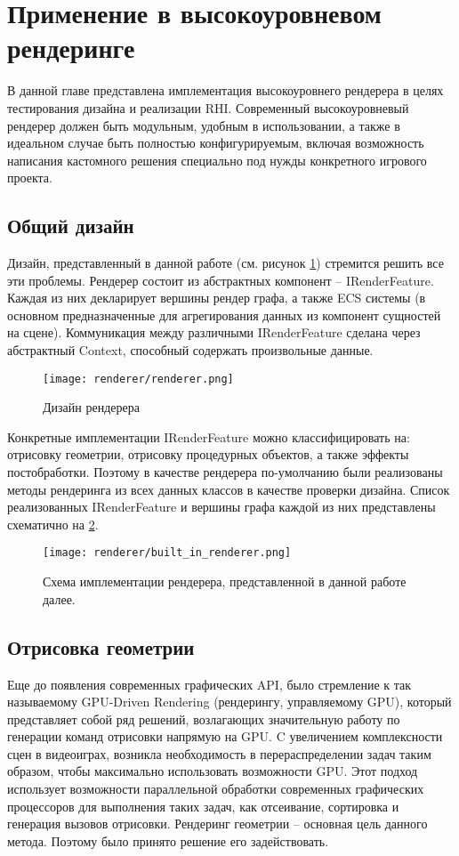 \section{Применение в высокоуровневом рендеринге}
В данной главе представлена имплементация высокоуровнего рендерера в целях тестирования дизайна и реализации RHI. Современный высокоуровневый рендерер должен быть модульным, удобным в использовании, а также в идеальном случае быть полностью конфигурируемым, включая возможность написания кастомного решения специально под нужды конкретного игрового проекта.

\subsection{Общий дизайн}
Дизайн, представленный в данной работе (см. рисунок \ref{fig:renderer_design}) стремится решить все эти проблемы. Рендерер состоит из абстрактных компонент -- IRenderFeature. Каждая из них декларирует вершины рендер графа, а также ECS системы (в основном предназначенные для агрегирования данных из компонент сущностей на сцене). Коммуникация между различными IRenderFeature сделана через абстрактный Context, способный содержать произвольные данные.

\begin{figure}[h]
    \centering
    \texttt{[image: renderer/renderer.png]}
    \caption{Дизайн рендерера}
    \label{fig:renderer_design}
\end{figure}

Конкретные имплементации IRenderFeature можно классифицировать на: отрисовку геометрии, отрисовку процедурных объектов, а также эффекты постобработки. Поэтому в качестве рендерера по-умолчанию были реализованы методы рендеринга из всех данных классов в качестве проверки дизайна. Список реализованных IRenderFeature и вершины графа каждой из них представлены схематично на \ref{fig:built_in_renderer}.

\begin{figure}[h]
    \centering
    \texttt{[image: renderer/built\_in\_renderer.png]}
    \caption{Схема имплементации рендерера, представленной в данной работе далее.}
    \label{fig:built_in_renderer}
\end{figure}

\subsection{Отрисовка геометрии}
Еще до появления современных графических API, было стремление к так называемому GPU-Driven Rendering \cite{ubisoft_gpu_driven_rendering} (рендерингу, управляемому GPU), который представляет собой ряд решений, возлагающих значительную работу по генерации команд отрисовки напрямую на GPU. C увеличением комплексности сцен в видеоиграх, возникла необходимость в перераспределении задач таким образом, чтобы максимально использовать возможности GPU. Этот подход использует возможности параллельной обработки современных графических процессоров для выполнения таких задач, как отсеивание, сортировка и генерация вызовов отрисовки. Рендеринг геометрии -- основная цель данного метода. Поэтому было принято решение его задействовать.

